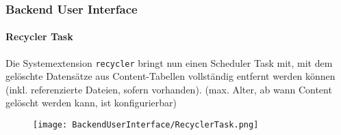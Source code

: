 \begin{frame}[fragile]
	\frametitle{Backend User Interface}
	\framesubtitle{Recycler Task}

	Die Systemextension \texttt{recycler} bringt nun einen Scheduler Task mit,
	mit dem gelöschte Datensätze aus Content-Tabellen vollständig entfernt werden
	können (inkl. referenzierte Dateien, sofern vorhanden).\newline
	\smaller
		(max. Alter, ab wann Content gelöscht werden kann, ist konfigurierbar)
	\normalsize

	\begin{figure}
		\texttt{[image: BackendUserInterface/RecyclerTask.png]}
	\end{figure}

\end{frame}

